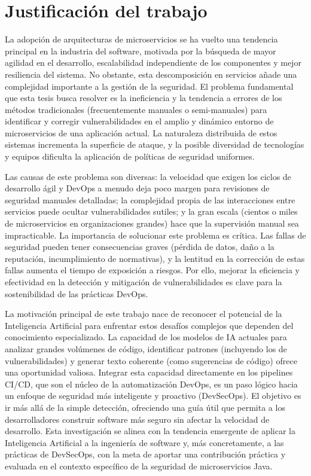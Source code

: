 \section{Justificación del trabajo}\label{sec:justificaciontrabajo}
La adopción de arquitecturas de microservicios se ha vuelto una tendencia principal en la industria del software, motivada por la búsqueda de mayor agilidad en el desarrollo, escalabilidad independiente de los componentes y mejor resiliencia del sistema. No obstante, esta descomposición en servicios añade una complejidad importante a la gestión de la seguridad. El problema fundamental que esta tesis busca resolver es la ineficiencia y la tendencia a errores de los métodos tradicionales (frecuentemente manuales o semi-manuales) para identificar y corregir vulnerabilidades en el amplio y dinámico entorno de microservicios de una aplicación actual. La naturaleza distribuida de estos sistemas incrementa la superficie de ataque, y la posible diversidad de tecnologías y equipos dificulta la aplicación de políticas de seguridad uniformes.

Las causas de este problema son diversas: la velocidad que exigen los ciclos de desarrollo ágil y DevOps a menudo deja poco margen para revisiones de seguridad manuales detalladas; la complejidad propia de las interacciones entre servicios puede ocultar vulnerabilidades sutiles; y la gran escala (cientos o miles de microservicios en organizaciones grandes) hace que la supervisión manual sea impracticable. La importancia de solucionar este problema es crítica. Las fallas de seguridad pueden tener consecuencias graves (pérdida de datos, daño a la reputación, incumplimiento de normativas), y la lentitud en la corrección de estas fallas aumenta el tiempo de exposición a riesgos. Por ello, mejorar la eficiencia y efectividad en la detección y mitigación de vulnerabilidades es clave para la sostenibilidad de las prácticas DevOps.

La motivación principal de este trabajo nace de reconocer el potencial de la Inteligencia Artificial para enfrentar estos desafíos complejos que dependen del conocimiento especializado. La capacidad de los modelos de IA actuales para analizar grandes volúmenes de código, identificar patrones (incluyendo los de vulnerabilidades) y generar texto coherente (como sugerencias de código) ofrece una oportunidad valiosa. Integrar esta capacidad directamente en los pipelines CI/CD, que son el núcleo de la automatización DevOps, es un paso lógico hacia un enfoque de seguridad más inteligente y proactivo (DevSecOps). El objetivo es ir más allá de la simple detección, ofreciendo una guía útil que permita a los desarrolladores construir software más seguro sin afectar la velocidad de desarrollo. Esta investigación se alinea con la tendencia emergente de aplicar la Inteligencia Artificial a la ingeniería de software y, más concretamente, a las prácticas de DevSecOps, con la meta de aportar una contribución práctica y evaluada en el contexto específico de la seguridad de microservicios Java.

